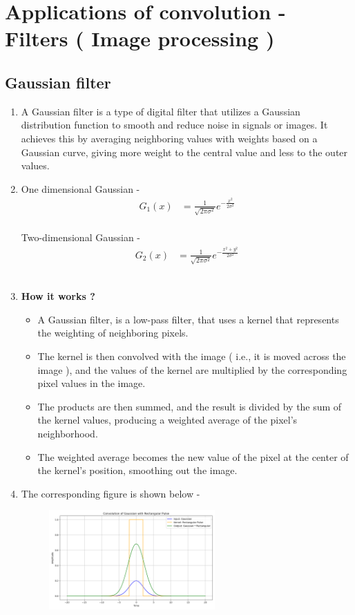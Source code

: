 \section{Applications of convolution - Filters ( Image processing )}
\subsection{Gaussian filter}
\begin{enumerate}
\item A Gaussian filter is a type of digital filter that utilizes a Gaussian distribution function to smooth and reduce noise in signals or images. It achieves this by averaging neighboring values with weights based on a Gaussian curve, giving more weight to the central value and less to the outer values.
\item One dimensional Gaussian - \\
\begin{align}
	G_{1} (x) &= \frac{1}{\sqrt{2 \pi \sigma^2}} e^{-\frac{x^2}{2 \sigma^2}}
\end{align} \\
Two-dimensional Gaussian - \\
\begin{align}
	G_{2} (x) &= \frac{1}{\sqrt{2 \pi \sigma^2}} e^{-\frac{x^2 + y^2}{2 \sigma^2}}
\end{align} \\
\item \textbf{How it works ?} 
\begin{itemize}
\item A Gaussian filter, is a low-pass filter, that uses a kernel that represents the weighting of neighboring pixels. 
\item The kernel is then convolved with the image ( i.e., it is moved across the image ), and the values of the kernel are multiplied by the corresponding pixel values in the image. 
\item The products are then summed, and the result is divided by the sum of the kernel values, producing a weighted average of the pixel's neighborhood. 
\item The weighted average becomes the new value of the pixel at the center of the kernel's position, smoothing out the image.
\end{itemize}
\item The corresponding figure is shown below - \\
\begin{figure}[h]
    \centering
    \includegraphics[width=0.6\textwidth]{figs/gaus_2.png}

\end{figure}
\end{enumerate}
